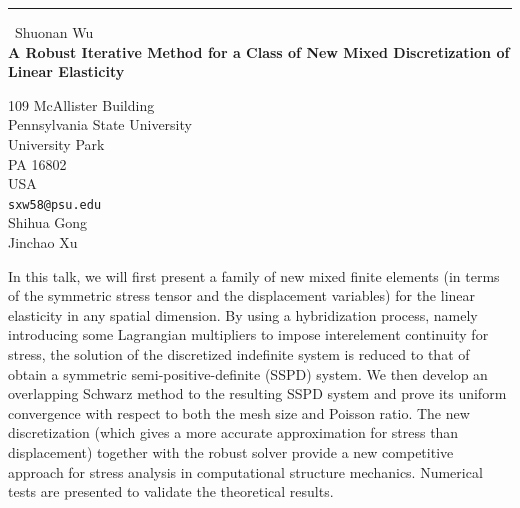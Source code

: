\documentclass{report}
\begin{document}
\begin{center}
\rule{6in}{1pt} \
{\large Shuonan Wu \\
{\bf A Robust Iterative Method for a Class of New Mixed Discretization of Linear Elasticity}}

109 McAllister Building \\ Pennsylvania State University \\ University Park \\ PA 16802 \\ USA
\\
{\tt sxw58@psu.edu}\\
Shihua Gong\\
Jinchao Xu\end{center}

In this talk, we will first present a family of new mixed finite elements
(in terms of the symmetric stress tensor and the displacement variables)
for the linear elasticity in any spatial dimension. By using a
hybridization process, namely introducing some Lagrangian
multipliers to impose interelement continuity for stress, the solution of
the discretized indefinite system is reduced to that of obtain a
symmetric semi-positive-definite (SSPD) system. We then develop an
overlapping Schwarz method to the resulting SSPD system and prove its
uniform convergence with respect to both the mesh size and Poisson ratio.
The new discretization (which gives a more accurate approximation for
stress than displacement) together with the robust solver provide a new
competitive approach for stress analysis in computational structure
mechanics. Numerical tests are presented
to validate the theoretical results.
\end{document}
